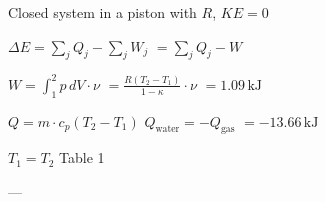 Closed system in a piston  
with \( R \), \( KE = 0 \)  

\( \Delta E = \sum_j Q_j - \sum_j W_j \)  
\( = \sum_j Q_j - W \)  

\( W = \int_{1}^{2} p \, dV \cdot \nu \)  
\( = \frac{R(T_2 - T_1)}{1 - \kappa} \cdot \nu \)  
\( = 1.09 \, \text{kJ} \)  

\( Q = m \cdot c_p (T_2 - T_1) \)  
\( Q_{\text{water}} = -Q_{\text{gas}} \)  
\( = -13.66 \, \text{kJ} \)  

\( T_1 = T_2 \)  
Table 1  

---